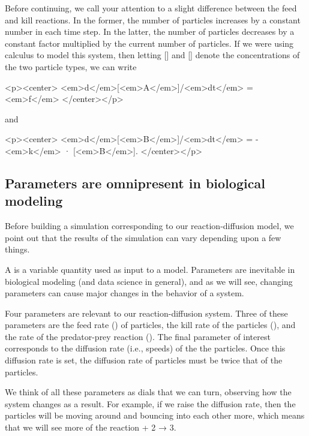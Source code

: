 {%

Before continuing, we call your attention to a slight difference between the feed and kill reactions. In the former, the number of  particles increases by a constant number in each time step. In the latter, the number of  particles decreases by a constant factor multiplied by the current number of  particles. If we were using calculus to model this system, then letting [] and [] denote the concentrations of the two particle types, we can write

<p><center>
<em>d</em>[<em>A</em>]/<em>dt</em> = <em>f</em>
</center></p>

and

<p><center>
<em>d</em>[<em>B</em>]/<em>dt</em> = -<em>k</em> · [<em>B</em>].
</center></p>

\FloatBarrier
{}
\subsection{Parameters are omnipresent in biological modeling}

Before building a simulation corresponding to our reaction-diffusion model, we point out that the results of the simulation can vary depending upon a few things.

A  is a variable quantity used as input to a model. Parameters are inevitable in biological modeling (and data science in general), and as we will see, changing parameters can cause major changes in the behavior of a system.

Four parameters are relevant to our reaction-diffusion system. Three of these parameters are the feed rate () of  particles, the kill rate of the  particles (), and the rate of the predator-prey reaction (). The final parameter of interest corresponds to the diffusion rate (i.e., speeds) of the the  particles. Once this diffusion rate is set, the diffusion rate of  particles must be twice that of the  particles.

We think of all these parameters as dials that we can turn, observing how the system changes as a result. For example, if we raise the diffusion rate, then the particles will be moving around and bouncing into each other more, which means that we will see more of the reaction  + 2 → 3.

}

